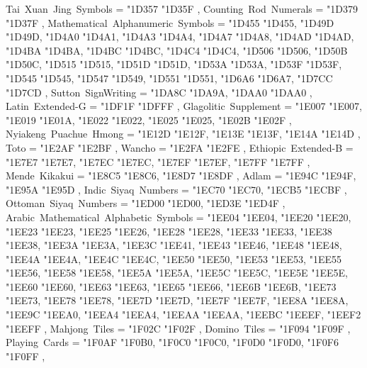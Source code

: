 {    Tai~Xuan~Jing~Symbols                          = { {"1D357} {"1D35F} },
    Counting~Rod~Numerals                          = { {"1D379} {"1D37F} },
    Mathematical~Alphanumeric~Symbols              = { {"1D455} {"1D455}, {"1D49D} {"1D49D}, {"1D4A0} {"1D4A1}, {"1D4A3} {"1D4A4}, {"1D4A7} {"1D4A8}, {"1D4AD} {"1D4AD}, {"1D4BA} {"1D4BA}, {"1D4BC} {"1D4BC}, {"1D4C4} {"1D4C4}, {"1D506} {"1D506}, {"1D50B} {"1D50C}, {"1D515} {"1D515}, {"1D51D} {"1D51D}, {"1D53A} {"1D53A}, {"1D53F} {"1D53F}, {"1D545} {"1D545}, {"1D547} {"1D549}, {"1D551} {"1D551}, {"1D6A6} {"1D6A7}, {"1D7CC} {"1D7CD} },
    Sutton~SignWriting                             = { {"1DA8C} {"1DA9A}, {"1DAA0} {"1DAA0} },
    Latin~Extended-G                               = { {"1DF1F} {"1DFFF} },
    Glagolitic~Supplement                          = { {"1E007} {"1E007}, {"1E019} {"1E01A}, {"1E022} {"1E022}, {"1E025} {"1E025}, {"1E02B} {"1E02F} },
    Nyiakeng~Puachue~Hmong                         = { {"1E12D} {"1E12F}, {"1E13E} {"1E13F}, {"1E14A} {"1E14D} },
    Toto                                           = { {"1E2AF} {"1E2BF} },
    Wancho                                         = { {"1E2FA} {"1E2FE} },
    Ethiopic~Extended-B                            = { {"1E7E7} {"1E7E7}, {"1E7EC} {"1E7EC}, {"1E7EF} {"1E7EF}, {"1E7FF} {"1E7FF} },
    Mende~Kikakui                                  = { {"1E8C5} {"1E8C6}, {"1E8D7} {"1E8DF} },
    Adlam                                          = { {"1E94C} {"1E94F}, {"1E95A} {"1E95D} },
    Indic~Siyaq~Numbers                            = { {"1EC70} {"1EC70}, {"1ECB5} {"1ECBF} },
    Ottoman~Siyaq~Numbers                          = { {"1ED00} {"1ED00}, {"1ED3E} {"1ED4F} },
    Arabic~Mathematical~Alphabetic~Symbols         = { {"1EE04} {"1EE04}, {"1EE20} {"1EE20}, {"1EE23} {"1EE23}, {"1EE25} {"1EE26}, {"1EE28} {"1EE28}, {"1EE33} {"1EE33}, {"1EE38} {"1EE38}, {"1EE3A} {"1EE3A}, {"1EE3C} {"1EE41}, {"1EE43} {"1EE46}, {"1EE48} {"1EE48}, {"1EE4A} {"1EE4A}, {"1EE4C} {"1EE4C}, {"1EE50} {"1EE50}, {"1EE53} {"1EE53}, {"1EE55} {"1EE56}, {"1EE58} {"1EE58}, {"1EE5A} {"1EE5A}, {"1EE5C} {"1EE5C}, {"1EE5E} {"1EE5E}, {"1EE60} {"1EE60}, {"1EE63} {"1EE63}, {"1EE65} {"1EE66}, {"1EE6B} {"1EE6B}, {"1EE73} {"1EE73}, {"1EE78} {"1EE78}, {"1EE7D} {"1EE7D}, {"1EE7F} {"1EE7F}, {"1EE8A} {"1EE8A}, {"1EE9C} {"1EEA0}, {"1EEA4} {"1EEA4}, {"1EEAA} {"1EEAA}, {"1EEBC} {"1EEEF}, {"1EEF2} {"1EEFF} },
    Mahjong~Tiles                                  = { {"1F02C} {"1F02F} },
    Domino~Tiles                                   = { {"1F094} {"1F09F} },
    Playing~Cards                                  = { {"1F0AF} {"1F0B0}, {"1F0C0} {"1F0C0}, {"1F0D0} {"1F0D0}, {"1F0F6} {"1F0FF} },
}
